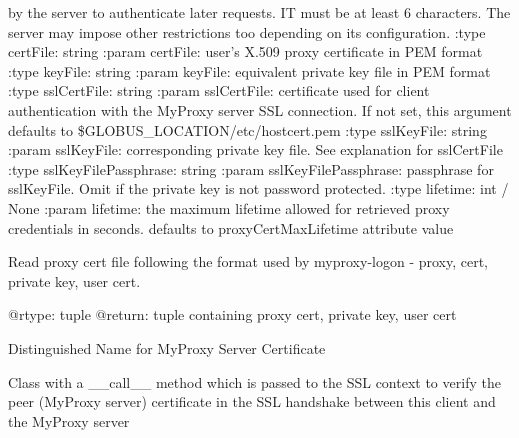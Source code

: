 \documentclass[letterpaper,10pt,english]{sphinxmanual}
\begin{document}
\begin{fulllineitems}
\begin{fulllineitems}
by the server to authenticate later requests.  IT must be at least
6 characters.  The server may impose other restrictions too depending
on its configuration.
:type certFile: string
:param certFile: user's X.509 proxy certificate in PEM format
:type keyFile: string
:param keyFile: equivalent private key file in PEM format
:type sslCertFile: string
:param sslCertFile: certificate used for client authentication with
the MyProxy server SSL connection.  If not set,
this argument defaults to \$GLOBUS\_LOCATION/etc/hostcert.pem 
:type sslKeyFile: string
:param sslKeyFile: corresponding private key file.  See explanation
for sslCertFile
:type sslKeyFilePassphrase: string 
:param sslKeyFilePassphrase: passphrase for sslKeyFile.  Omit if the
private key is not password protected.  
:type lifetime: int / None
:param lifetime: the maximum lifetime allowed for retrieved proxy 
credentials in seconds. defaults to proxyCertMaxLifetime attribute value

\end{fulllineitems}


\begin{fulllineitems}
\label{client:myproxy.client.MyProxyClient.readProxyFile}
Read proxy cert file following the format used by myproxy-logon - 
proxy, cert, private key, user cert.

@rtype: tuple
@return: tuple containing proxy cert, private key, user cert

\end{fulllineitems}


\begin{fulllineitems}
\label{client:myproxy.client.MyProxyClient.serverDN}
Distinguished Name for MyProxy Server Certificate

\end{fulllineitems}


\begin{fulllineitems}
\label{client:myproxy.client.MyProxyClient.serverSSLCertVerify}
Class with a \_\_call\_\_ method which is passed to the SSL context to verify the peer (MyProxy server) certificate in the SSL handshake between this client and the MyProxy server


\end{fulllineitems}
\end{fulllineitems}
\end{document}
